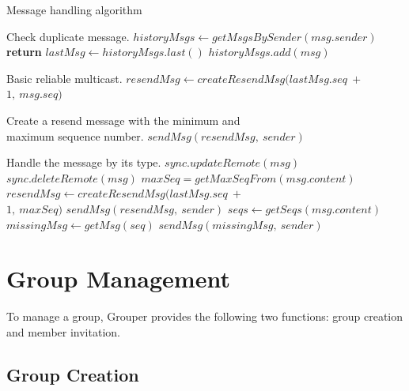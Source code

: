 \documentclass[a4paper,11pt]{report}
\begin{document}
\begin{algorithm}[t]
	\caption{Message handling algorithm}\label{alg:euclid}
	\begin{algorithmic}[1]		
		\LeftComment Check duplicate message.
		\State  $historyMsgs \gets getMsgsBySender(msg.sender)$
		\State \textbf{return}
		\EndIf
		\State $lastMsg \gets historyMsgs.last()$
		\State $historyMsgs.add(msg)$
		
		\LeftComment Basic reliable multicast.
		\State $resendMsg \gets createResendMsg(lastMsg.seq\ +\ $ \\\hspace{2.7cm} $1,\ msg.seq)$
		
		\Comment Create a resend message with the minimum and \\\hspace{1.7cm} maximum sequence number.
		\State $sendMsg(resendMsg,\ sender)$
		\EndIf
		
		\LeftComment Handle the message by its type.
		\State $sync.updateRemote(msg)$
		\State $sync.deleteRemote(msg)$
		\State $maxSeq = getMaxSeqFrom(msg.content)$
		\State $resendMsg \gets createResendMsg(lastMsg.seq\ +\ $ \\\hspace{2.7cm}  $1,\ maxSeq)$
		\State $sendMsg(resendMsg,\ sender)$
		\EndIf
		\State $seqs \gets getSeqs(msg.content)$
		\State $missingMsg \gets getMsg(seq)$
		\State $sendMsg(missingMsg,\ sender)$
		\EndFor
		\EndIf
		\EndProcedure
	\end{algorithmic}
	\label{algorithm:receive_message}
\end{algorithm}

\section{Group Management}  \label{section:group_management}

To manage a group, Grouper provides the following two functions: group creation and member invitation.

\subsection{Group Creation}
\end{document}
